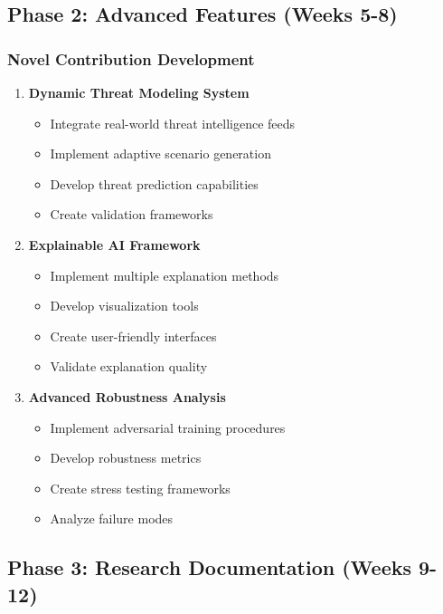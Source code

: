 \documentclass[12pt,a4paper]{article}
\begin{document}
\subsection{Phase 2: Advanced Features (Weeks 5-8)}

\subsubsection{Novel Contribution Development}
\begin{enumerate}
    \item \textbf{Dynamic Threat Modeling System}
    \begin{itemize}
        \item Integrate real-world threat intelligence feeds
        \item Implement adaptive scenario generation
        \item Develop threat prediction capabilities
        \item Create validation frameworks
    \end{itemize}
    
    \item \textbf{Explainable AI Framework}
    \begin{itemize}
        \item Implement multiple explanation methods
        \item Develop visualization tools
        \item Create user-friendly interfaces
        \item Validate explanation quality
    \end{itemize}
    
    \item \textbf{Advanced Robustness Analysis}
    \begin{itemize}
        \item Implement adversarial training procedures
        \item Develop robustness metrics
        \item Create stress testing frameworks
        \item Analyze failure modes
    \end{itemize}
\end{enumerate}

\subsection{Phase 3: Research Documentation (Weeks 9-12)}
\end{document}

